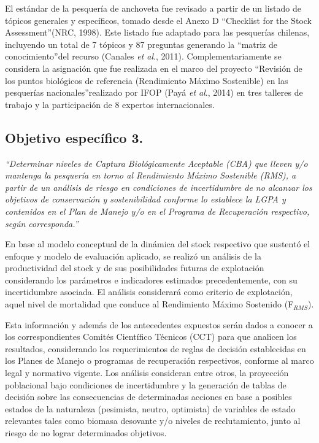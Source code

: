 \documentclass[letter,11pt]{article}
\begin{document}
El est\'andar de la pesquer\'ia de anchoveta fue revisado a partir de un
listado de t\'opicos generales y espec\'ificos, tomado desde el Anexo D
\textquotedblleft Checklist for the Stock Assessment\textquotedblright (NRC, 1998). Este listado fue
adaptado para las pesquer\'ias chilenas, incluyendo un total de 7 t\'opicos
y 87 preguntas generando la \textquotedblleft matriz de conocimiento\textquotedblright del recurso
(Canales \textit{et al}., 2011). Complementariamente se considera la
asignaci\'on que fue realizada en el marco del proyecto \textquotedblleft Revisi\'on de los
puntos biol\'ogicos de referencia (Rendimiento M\'aximo Sostenible) en las
pesquer\'ias nacionales\textquotedblright realizado por IFOP (Pay\'a \textit{et al}., 2014)
en tres talleres de trabajo y la participaci\'on de 8 expertos
internacionales. \\


\clearpage
\newpage

\subsection{Objetivo espec\'ifico 3.}

\textit{\textquotedblleft Determinar niveles de Captura Biol\'ogicamente Aceptable (CBA) que lleven y/o mantenga la pesquer\'ia en torno al Rendimiento M\'aximo Sostenible (RMS), a partir de un an\'alisis de riesgo en condiciones de incertidumbre de no alcanzar los objetivos de conservaci\'on y sostenibilidad conforme lo establece la LGPA y contenidos en el Plan de Manejo y/o en el Programa de Recuperaci\'on respectivo, seg\'un corresponda.\textquotedblright}
\vspace{0.5cm}

En base al modelo conceptual de la din\'amica del stock respectivo que
sustent\'o el enfoque y modelo de evaluaci\'on aplicado, se realiz\'o un
an\'alisis de la productividad del stock y de sus posibilidades futuras de
explotaci\'on considerando los par\'ametros e indicadores estimados
precedentemente, con su incertidumbre asociada. El an\'alisis considerar\'a
como criterio de explotaci\'on, aquel nivel de mortalidad que conduce al
Rendimiento M\'aximo Sostenido (F$_{RMS}$).

Esta informaci\'on y adem\'as de los antecedentes expuestos ser\'an dados a
conocer a los correspondientes Comit\'es Cient\'ifico T\'ecnicos (CCT) para
que analicen los resultados, considerando los requerimientos de reglas
de decisi\'on establecidas en los Planes de Manejo o programas de
recuperaci\'on respectivos, conforme al marco legal y normativo vigente.
Los an\'alisis consideran entre otros, la proyecci\'on poblacional bajo
condiciones de incertidumbre y la generaci\'on de tablas de decisi\'on sobre
las consecuencias de determinadas acciones en base a posibles estados de
la naturaleza (pesimista, neutro, optimista) de variables de estado
relevantes tales como biomasa desovante y/o niveles de reclutamiento,
junto al riesgo de no lograr determinados objetivos.
\end{document}
